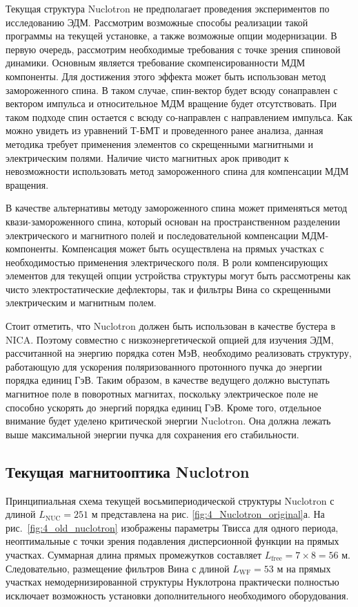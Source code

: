 \par Текущая структура Nuclotron не предполагает проведения экспериментов по исследованию ЭДМ. Рассмотрим возможные способы реализации такой программы на текущей установке, а также возможные опции модернизации. В первую очередь, рассмотрим необходимые требования с точке зрения спиновой динамики. Основным является требование скомпенсированности МДМ компоненты. Для достижения этого эффекта может быть использован метод замороженного спина. В таком случае, спин-вектор будет всюду сонаправлен с вектором импульса и относительное МДМ вращение будет отсутствовать. При таком подходе спин остается с всюду со-направлен с направлением импульса. Как можно увидеть из уравнений Т-БМТ и проведенного ранее анализа, данная методика требует применения элементов со скрещенными магнитными и электрическим полями. Наличие чисто магнитных арок приводит к невозможности использовать метод замороженного спина для компенсации МДМ вращения.

\par В качестве альтернативы методу замороженного спина может применяться метод квази-замороженного спина, который основан на пространственном разделении электрического и магнитного полей и последовательной компенсации МДМ-компоненты. Компенсация может быть осуществлена на прямых участках с необходимостью применения электрического поля. В роли компенсирующих элементов для текущей опции устройства структуры могут быть рассмотрены как чисто электростатические дефлекторы, так и фильтры Вина со скрещенными электрическим и магнитным полем.

\par Стоит отметить, что Nuclotron должен быть использован в качестве бустера в NICA. Поэтому совместно с низкоэнергетической опцией для изучения ЭДМ, рассчитанной на энергию порядка сотен МэВ, необходимо реализовать структуру, работающую для ускорения поляризованного протонного пучка до энергии порядка единиц ГэВ. Таким образом, в качестве ведущего должно выступать магнитное поле в поворотных магнитах, поскольку электрическое поле не способно ускорять до энергий порядка единиц ГэВ. Кроме того, отдельное внимание будет уделено критической энергии Nuclotron. Она должна лежать выше максимальной энергии пучка для сохранения его стабильности.
	
	\subsection{Текущая магнитооптика Nuclotron}\label{sec:EDM/optics}
\par Принципиальная схема текущей восьмипериодической структуры Nuclotron с длиной $L_{\text{NUC}}=251$ м представлена на рис. \ref{fig:4_Nuclotron_original}а. На рис.~\ref{fig:4_old_nuclotron} изображены параметры Твисса для одного периода, неоптимальные с точки зрения подавления дисперсионной функции на прямых участках. Суммарная длина прямых промежутков составляет $L_{\text{free}} = 7\times8=56$ м. Следовательно, размещение фильтров Вина с длиной $L_{\text{WF}} = 53$ м на прямых участках немодернизированной структуры Нуклотрона практически полностью исключает возможность установки дополнительного необходимого оборудования. 

